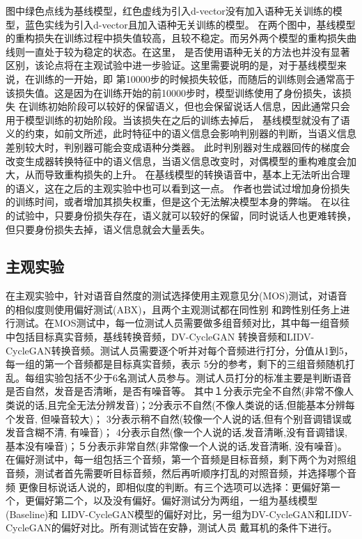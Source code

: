 图中绿色点线为基线模型，红色虚线为引入d-vector没有加入语种无关训练的模型，蓝色实线为引入d-vector且加入语种无关训练的模型。
在两个图中，基线模型的重构损失在训练过程中损失值较高，且较不稳定。而另外两个模型的重构损失曲线则一直处于较为稳定的状态。在这里，
是否使用语种无关的方法也并没有显著区别，该论点将在主观试验中进一步验证。这里需要说明的是，对于基线模型来说，在训练的一开始，即
第10000步的时候损失较低，而随后的训练则会通常高于该损失值。这是因为在训练开始的前10000步时，模型训练使用了身份损失，该损失
在训练初始阶段可以较好的保留语义，但也会保留说话人信息，因此通常只会用于模型训练的初始阶段。当该损失在之后的训练去掉后，
基线模型就没有了语义的约束，如前文所述，此时特征中的语义信息会影响判别器的判断，当语义信息差别较大时，判别器可能会变成语种分类器。
此时判别器对生成器回传的梯度会改变生成器转换特征中的语义信息，当语义信息改变时，对偶模型的重构难度会加大，从而导致重构损失的上升。
在基线模型的转换语音中，基本上无法听出合理的语义，这在之后的主观实验中也可以看到这一点。
作者也尝试过增加身份损失的训练时间，或者增加其损失权重，但是这个无法解决模型本身的弊端。
在以往的试验中，只要身份损失存在，语义就可以较好的保留，同时说话人也更难转换，
但只要身份损失去掉，语义信息就会大量丢失。

\subsection{主观实验}
在主观实验中，针对语音自然度的测试选择使用主观意见分(MOS)测试，对语音的相似度则使用偏好测试(ABX)，且两个主观测试都在同性别
和跨性别任务上进行测试。在MOS测试中，每一位测试人员需要做多组音频对比，其中每一组音频中包括目标真实音频，基线转换音频，DV-CycleGAN
转换音频和LIDV-CycleGAN转换音频。测试人员需要逐个听并对每个音频进行打分，分值从1到5，每一组的第一个音频都是目标真实音频，表示
5分的参考，剩下的三组音频随机打乱。每组实验包括不少于6名测试人员参与。测试人员打分的标准主要是判断语音是否自然，发音是否清晰，是否有噪音等。
其中１分表示完全不自然(非常不像人类说的话,且完全无法分辨发音)；2分表示不自然(不像人类说的话,但能基本分辨每个发音, 但噪音较大)；
3分表示稍不自然(较像一个人说的话,但有个别音调错误或发音含糊不清, 有噪音)；
4分表示自然(像一个人说的话,发音清晰,没有音调错误,基本没有噪音)；５分表示非常自然(非常像一个人说的话,发音清晰, 没有噪音)。
在偏好测试中，每一组包括三个音频，第一个音频是目标音频，剩下两个为对照组音频，测试者首先需要听目标音频，然后再听顺序打乱的对照音频，并选择哪个音频
更像目标说话人说的，即相似度的判断。有三个选项可以选择：更偏好第一个，更偏好第二个，以及没有偏好。偏好测试分为两组，一组为基线模型(Baseline)和
LIDV-CycleGAN模型的偏好对比，另一组为DV-CycleGAN和LIDV-CycleGAN的偏好对比。所有测试皆在安静，测试人员
戴耳机的条件下进行。

